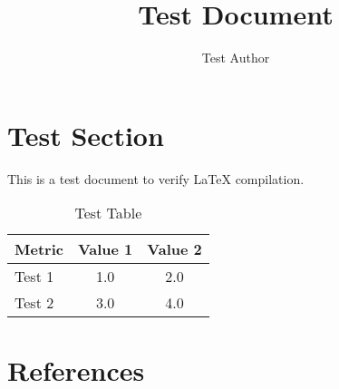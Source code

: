 \documentclass[12pt,a4paper]{article}
\title{Test Document}
\author{Test Author}
\begin{document}
\maketitle

\section{Test Section}

This is a test document to verify LaTeX compilation.

\begin{table}[htbp]
\centering
\caption{Test Table}
\label{tab:test}
\begin{tabular}{@{}lcc@{}}
\toprule
\textbf{Metric} & \textbf{Value 1} & \textbf{Value 2} \\
\midrule
Test 1 & 1.0 & 2.0 \\
Test 2 & 3.0 & 4.0 \\
\bottomrule
\end{tabular}
\end{table}

\section{References}


\end{document}
